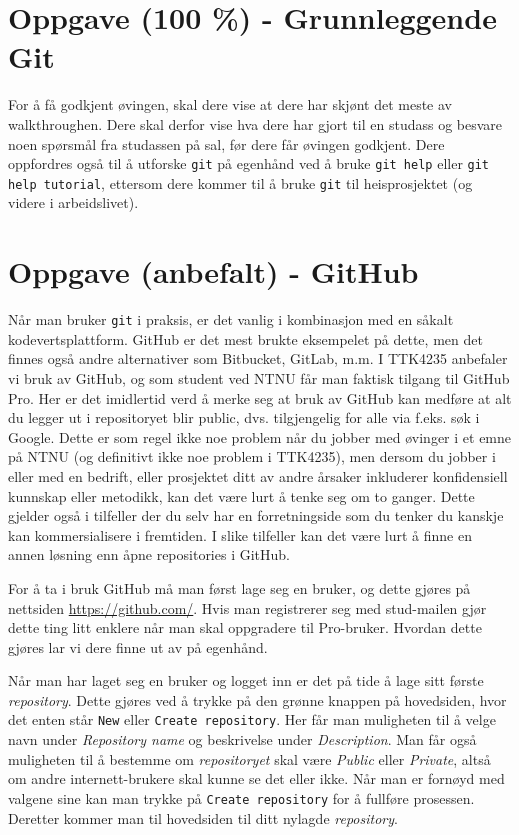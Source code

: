 





\section{Oppgave (100 \%) - Grunnleggende Git}\label{sec:2-oppgave}

For å få godkjent øvingen, skal dere vise at dere har skjønt det meste av walkthroughen. Dere skal derfor vise hva dere har gjort til en studass og besvare noen spørsmål fra studassen på sal, før dere får øvingen godkjent. Dere oppfordres også til å utforske \verb|git| på egenhånd ved å bruke \verb|git help| eller \verb|git help tutorial|, ettersom dere kommer til å bruke \verb|git| til heisprosjektet (og videre i arbeidslivet).

\section{Oppgave (anbefalt) - GitHub}
Når man bruker \verb|git| i praksis, er det vanlig i kombinasjon med en såkalt kodevertsplattform. GitHub er det mest brukte eksempelet på dette, men det finnes også andre alternativer som Bitbucket, GitLab, m.m. I TTK4235 anbefaler vi bruk av GitHub, og som student ved NTNU får man faktisk tilgang til GitHub Pro.
Her er det imidlertid verd å merke seg at bruk av GitHub kan medføre at alt du legger ut i repositoryet blir public, dvs. tilgjengelig for alle via f.eks. søk i Google.
Dette er som regel ikke noe problem når du jobber med øvinger i et emne på NTNU (og definitivt ikke noe problem i TTK4235), men dersom du jobber i eller med en bedrift, eller prosjektet ditt av andre årsaker inkluderer konfidensiell kunnskap eller metodikk, kan det være lurt å tenke seg om to ganger. 
Dette gjelder også i tilfeller der du selv har en forretningside som du tenker du kanskje kan kommersialisere i fremtiden. 
I slike tilfeller kan det være lurt å finne en annen løsning enn åpne repositories i GitHub. 

For å ta i bruk GitHub må man først lage seg en bruker, og dette gjøres på nettsiden \href{https://github.com/}{https://github.com/}. Hvis man registrerer seg med stud-mailen gjør dette ting litt enklere når man skal oppgradere til Pro-bruker. Hvordan dette gjøres lar vi dere finne ut av på egenhånd. 

Når man har laget seg en bruker og logget inn er det på tide å lage sitt første \textit{repository}. Dette gjøres ved å trykke på den grønne knappen på hovedsiden, hvor det enten står \verb|New| eller \verb|Create repository|. Her får man muligheten til å velge navn under \textit{Repository name} og beskrivelse under \textit{Description}. Man får også muligheten til å bestemme om \textit{repositoryet} skal være \textit{Public} eller \textit{Private}, altså om andre internett-brukere skal kunne se det eller ikke. Når man er fornøyd med valgene sine kan man trykke på \verb|Create repository| for å fullføre prosessen. Deretter kommer man til hovedsiden til ditt nylagde \textit{repository}.

